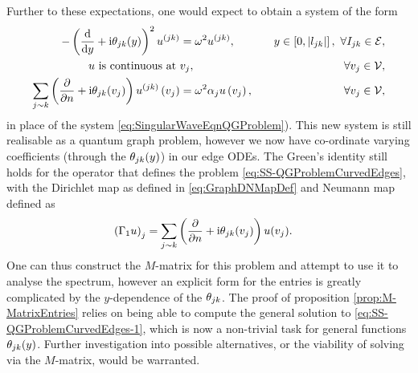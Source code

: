 Further to these expectations, one would expect to obtain a system of the form
\begin{subequations} \label{eq:SS-QGProblemCurvedEdges}
	\begin{align}
		-\left( \dfrac{\mathrm{d}}{\mathrm{d}y} + \mathrm{i}\theta_{jk}(y) \right)^2 u^{(jk)} &= \omega^2 u^{(jk)}, \quad &y\in\left[ 0,\left\lvert l_{jk} \right\rvert \right], \ \forall I_{jk}\in\mathcal{E}, \label{eq:SS-QGProblemCurvedEdges-1} \\
		u \text{ is continuous at } & v_j, \quad &\forall v_j\in\mathcal{V},  \\
		\sum_{j\sim k}\left( \dfrac{\partial }{\partial n} + \mathrm{i}\theta_{jk}(v_j) \right)u^{(jk)}\left( v_j \right) &= \omega^2\alpha_j u\left( v_j \right), \quad &\forall v_j\in\mathcal{V},
	\end{align}
\end{subequations}
in place of the system \eqref{eq:SingularWaveEqnQGProblem}).
This new system is still realisable as a quantum graph problem, however we now have co-ordinate varying coefficients (through the $\theta_{jk}(y)$) in our edge ODEs.
The Green's identity still holds for the operator that defines the problem \eqref{eq:SS-QGProblemCurvedEdges}, with the Dirichlet map as defined in \eqref{eq:GraphDNMapDef} and Neumann map defined as
\begin{align*}
	\left( \Gamma_1 u \right)_j &= \sum_{j\sim k} \left(  \dfrac{\partial }{\partial n} + \mathrm{i}\theta_{jk}(v_j)  \right)u(v_j) .
\end{align*}
One can thus construct the $M$-matrix for this problem and attempt to use it to analyse the spectrum, however an explicit form for the entries is greatly complicated by the $y$-dependence of the $\theta_{jk}$.
The proof of proposition \ref{prop:M-MatrixEntries} relies on being able to compute the general solution to \eqref{eq:SS-QGProblemCurvedEdges-1}, which is now a non-trivial task for general functions $\theta_{jk}(y)$.
Further investigation into possible alternatives, or the viability of solving via the $M$-matrix, would be warranted.

